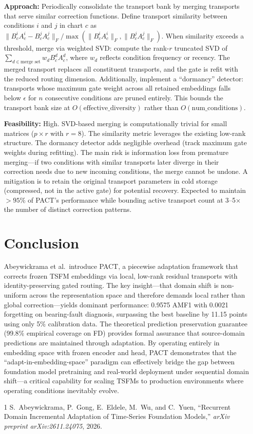 \documentclass[11pt,a4paper]{article}
\begin{document}
\textbf{Approach:} Periodically consolidate the transport bank by merging transports that serve similar correction functions. Define transport similarity between conditions $i$ and $j$ in chart $c$ as $\|B_c^i A_c^i - B_c^j A_c^j\|_F / \max(\|B_c^i A_c^i\|_F, \|B_c^j A_c^j\|_F)$. When similarity exceeds a threshold, merge via weighted SVD: compute the rank-$r$ truncated SVD of $\sum_{d \in \text{merge set}} w_d B_c^d A_c^d$, where $w_d$ reflects condition frequency or recency. The merged transport replaces all constituent transports, and the gate is refit with the reduced routing dimension. Additionally, implement a ``dormancy'' detector: transports whose maximum gate weight across all retained embeddings falls below $\epsilon$ for $n$ consecutive conditions are pruned entirely. This bounds the transport bank size at $O(\text{effective\_diversity})$ rather than $O(\text{num\_conditions})$.

\textbf{Feasibility:} High. SVD-based merging is computationally trivial for small matrices ($p \times r$ with $r{=}8$). The similarity metric leverages the existing low-rank structure. The dormancy detector adds negligible overhead (track maximum gate weights during refitting). The main risk is information loss from premature merging---if two conditions with similar transports later diverge in their correction needs due to new incoming conditions, the merge cannot be undone. A mitigation is to retain the original transport parameters in cold storage (compressed, not in the active gate) for potential recovery. Expected to maintain $>95\%$ of PACT's performance while bounding active transport count at 3--5$\times$ the number of distinct correction patterns.

\section{Conclusion}
Abeywickrama et al.\ introduce PACT, a piecewise adaptation framework that corrects frozen TSFM embeddings via local, low-rank residual transports with identity-preserving gated routing. The key insight---that domain shift is non-uniform across the representation space and therefore demands local rather than global correction---yields dominant performance: 0.9575 AMF1 with 0.0021 forgetting on bearing-fault diagnosis, surpassing the best baseline by 11.15 points using only 5\% calibration data. The theoretical prediction preservation guarantee (99.8\% empirical coverage on FD) provides formal assurance that source-domain predictions are maintained through adaptation. By operating entirely in embedding space with frozen encoder and head, PACT demonstrates that the ``adapt-in-embedding-space'' paradigm can effectively bridge the gap between foundation model pretraining and real-world deployment under sequential domain shift---a critical capability for scaling TSFMs to production environments where operating conditions inevitably evolve.

\begin{thebibliography}{1}
S.~Abeywickrama, P.~Gong, E.~Eldele, M.~Wu, and C.~Yuen,
``Recurrent Domain Incremental Adaptation of Time-Series Foundation Models,''
\textit{arXiv preprint arXiv:2611.24075}, 2026.
\end{thebibliography}
\end{document}
